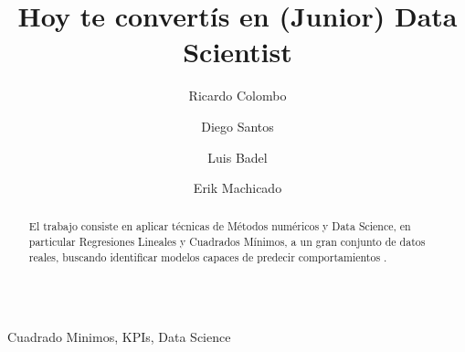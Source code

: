\documentclass{endm}
\begin{document}
\begin{verbatim}\end{verbatim}\vspace{2.5cm}

\begin{frontmatter}

\title{Hoy te convert\'is en (Junior) Data Scientist}

\author{Ricardo Colombo}
\author{Diego Santos}
\author{Luis Badel}
\author{Erik Machicado}
\address{Departamento de Computaci\'on\\ Universidad de Buenos Aires\\ C.A.B.A, Argentina}



\begin{abstract}
El trabajo consiste en aplicar t\'ecnicas de M\'etodos num\'ericos y 
Data Science, en particular Regresiones Lineales y Cuadrados M\'inimos, 
a un gran conjunto de datos reales, buscando identificar modelos 
capaces de predecir comportamientos .
\end{abstract}

\begin{keyword}
Cuadrado Minimos, KPIs, Data Science
\end{keyword}

\end{frontmatter}
\end{document}
